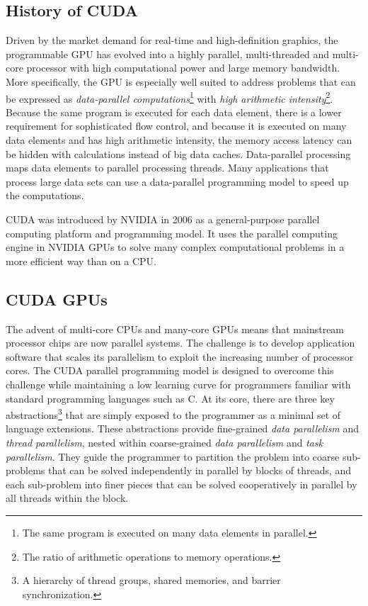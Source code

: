 \documentclass[12pt]{article}
\newcommand*{\Nvidia}{\textsc{NVIDIA}}
\newcommand*{\Cuda}{\textsc{CUDA}}
\begin{document}
\subsection{History of \Cuda{}}
Driven by the market demand for real-time and high-definition graphics, the programmable GPU has evolved into a highly parallel, multi-threaded and multi-core processor with high computational power and large memory bandwidth. More specifically, the GPU is especially well suited to address problems that can be expressed as \textit{data-parallel computations}\footnote{ The same program is executed on many data elements in parallel.} with \textit{high arithmetic intensity}\footnote{ The ratio of arithmetic operations to memory operations.}. Because the same program is executed for each data element, there is a lower requirement for sophisticated flow control, and because it is executed on many data elements and has high arithmetic intensity, the memory access latency can be hidden with calculations instead of big data caches. Data-parallel processing maps data elements to parallel processing threads. Many applications that process large data sets can use a data-parallel programming model to speed up the computations.

\Cuda{} was introduced by \Nvidia{} in 2006 as a general-purpose parallel computing platform and programming model. It uses the parallel computing engine in \Nvidia{} GPUs to solve many complex computational problems in a more efficient way than on a CPU.

\subsection{\Cuda{} GPUs}

The advent of multi-core CPUs and many-core GPUs means that mainstream processor chips are now parallel systems. The challenge is to develop application software that scales its parallelism to exploit the increasing number of processor cores. The \Cuda{} parallel programming model is designed to overcome this challenge while maintaining a low learning curve for programmers familiar with standard programming languages such as C. At its core, there are three key abstractions\footnote{ A hierarchy of thread groups, shared memories, and barrier synchronization.} that are simply exposed to the programmer as a minimal set of language extensions. These abstractions provide fine-grained \textit{data parallelism} and \textit{thread parallelism}, nested within coarse-grained \textit{data parallelism} and \textit{task parallelism}. They guide the programmer to partition the problem into coarse sub-problems that can be solved independently in parallel by blocks of threads, and each sub-problem into finer pieces that can be solved cooperatively in parallel by all threads within the block.
\end{document}
